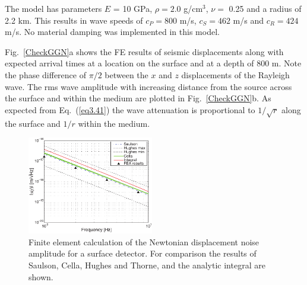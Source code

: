 The model has parameters $E$ = 10 GPa, $\rho=2.0$ g/cm$^3$, $\nu=$ 0.25 and a radius of 2.2 km. This results in wave speeds of $c_P = 800$ m/s, $c_S = 462$ m/s and $c_R = 424$ m/s. No material damping was implemented in this model. 

Fig.~\ref{CheckGGN}a shows the FE results of seismic displacements along with expected arrival times at a location on the surface and at a depth of 800 m. Note the phase difference of $\pi/2$ between the $x$ and $z$ displacements of the Rayleigh wave. The rms wave amplitude with increasing distance from the source across the surface and within the medium are plotted in Fig.~\ref{CheckGGN}b. As expected from Eq.~(\ref{eq3.41}) the wave attenuation is proportional to $1/\sqrt{r}$ along the surface and $1/r$ within the medium. 
\begin{figure}[t] 
  	\begin{center}
   		\includegraphics[width=0.49\textwidth]{./Sec_SiteInfra/Figures/ThorneSaulFEMcomparison_surface2.pdf} 
   		\caption{Finite element calculation of the Newtonian displacement noise amplitude for a surface detector. For comparison the results of Saulson, Cella, Hughes and Thorne, and the analytic integral are shown.}
   		\label{fig:FEresult}
   	\end{center}
\end{figure}

